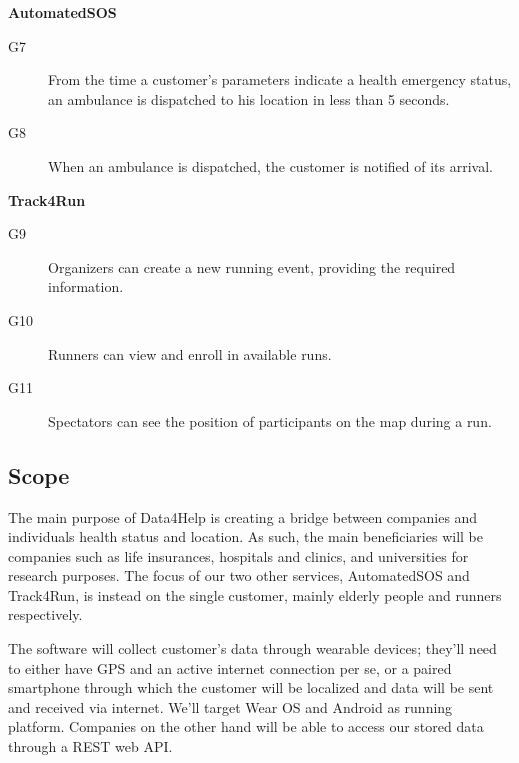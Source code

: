 \documentclass[../main.tex]{subfiles}
\begin{document}
\begin{minipage}{\textwidth}
{\bf AutomatedSOS}
\begin{description}
	\item [G7]  From the time a customer's parameters indicate a health emergency status, an ambulance is dispatched to his location in less than 5 seconds.
	\item [G8]  When an ambulance is dispatched, the customer is notified of its arrival.
\end{description}
\end{minipage}
\vspace{8mm}

\begin{minipage}{\textwidth}
{\bf Track4Run}
\begin{description}
	\item [G9]   Organizers can create a new running event, providing the required information.
	\item [G10]  Runners can view and enroll in available runs.
	\item [G11]  Spectators can see the position of participants on the map during a run.
\end{description}
\end{minipage}

\subsection{Scope}

The main purpose of Data4Help is creating a bridge between companies and individuals health status and location. As such, the main beneficiaries will be companies such as life insurances, hospitals and clinics, and universities for research purposes.
The focus of our two other services, AutomatedSOS and Track4Run, is instead on the single customer, mainly elderly people and runners respectively.

The software will collect customer's data through wearable devices; they'll need to either have GPS and an active internet connection per se, or a paired smartphone through which the customer will be localized and data will be sent and received via internet. We'll target Wear OS and Android as running platform. Companies on the other hand will be able to access our stored data through a REST web API.
\end{document}

